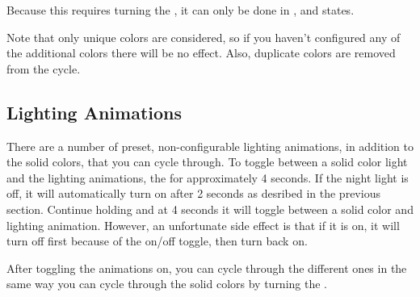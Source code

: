 \par\medskip

Because this requires turning the , it can only be done in ,
 and  states.


Note that only unique colors are considered, so if you haven't
configured any of the additional colors there will be no effect.  Also,
duplicate colors are removed from the cycle.


\subsection{Lighting Animations}

There are a number of preset, non-configurable lighting animations, in addition
to the solid colors, that you can cycle through.  To toggle between a solid
color light and the lighting animations,  the  for approximately
\num{4} seconds. If the night light is off, it will automatically turn on after
\num{2} seconds as desribed in the previous section.  Continue holding and at
\num{4} seconds it will toggle between a solid color and lighting animation.
However, an unfortunate side effect is that if it is on, it will turn off first
because of the on/off toggle, then turn back on.


After toggling the animations on, you can cycle through the different ones in
the same way you can cycle through the solid colors by turning the .

